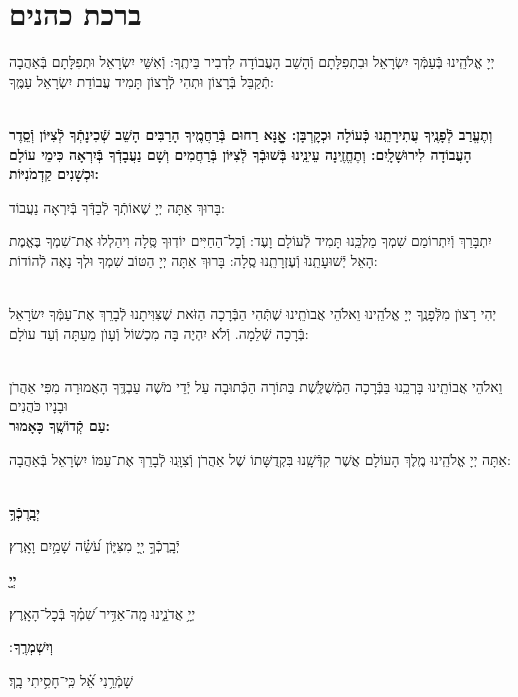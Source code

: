 \documentclass[twoside, openany, parskip=half, 11pt]{book}
\begin{document}
\section[ברכת כהנים]{ ברכת כהנים ‎}
\label{birkaskohanim}

יְיָ אֱלֹהֵֽינוּ בְּֿעַמְּֿךָ יִשְׂרָאֵל וּבִתְפִלָּתָם וְֿהָשֵׁב הָעֲבוֹדָה לִדְבִיר בֵּיתֶֽךָ: וְֿאִשֵּׁי יִשְׂרָאֵל וּתְפִלָּתָם בְּֿאַהֲבָה תְֿקַבֵּל בְּֿרָצוֹן וּתְהִי לְֿרָצוֹן תָּמִיד עֲבוֹדַת יִשְׂרָאֵל עַמֶּֽךָ:

\chazzanvkahal \\
\textbf{
	וְתֶעֱרַב לְֿפָנֶֽיךָ עֲתִירָתֵֽנוּ כְּֿעוֹלָה וּכְקׇרְבָּן:
	אׇׇׇׇָנָּא רַחוּם בְּֿרַחֲמֶֽיךָ הָרַבִּים הָשֵׁב שְֿׁכִינָתְֿךָ לְֿצִיּוֹן וְֿסֵֽדֶר הָעֲבוֹדָה לִירוּשָׁלָֽיִם:
	וְתֶחֱזֶֽינָה עֵינֵֽינוּ בְּֿשׁוּבְֿךָ לְֿצִיּוֹן בְּֿרַחֲמִים
	וְשָׁם נַעֲבָדְֿךָ בְּֿיִרְאָה כִּימֵי עוֹלָם וּכְשָׁנִים קַדְמֹנִיּוֹת:
}

\chazzan
בָּרוּךְ אַתָּה יְיָ שֶׁאוֹתְֿךָ לְֿבַדְּֿךָ בְּֿיִרְאָה נַעֲבוֹד:

\modim

יִתְבָּרַךְ וְֿיִתְרוֹמַם שִׁמְךָ מַלְכֵּֽנוּ תָּמִיד לְֿעוֹלָם וָעֶד: וְֿכׇל־הַחַיִּים יוֹדֽוּךָ סֶּֽלָה וִיהַלְלוּ אֶת־שִׁמְךָ בֶּאֱמֶת הָאֵל יְֿשׁוּעָתֵֽנוּ וְֿעֶזְרָתֵֽנוּ סֶֽלָה: בָּרוּךְ אַתָּה יְיָ הַטּוֹב שִׁמְךָ וּלְךָ נָאֶה לְֿהוֹדוֹת:

\\
יְהִי רָצוׂן מִלְּֿפָנֶֽךָ יְיָ אֱלֹהֵֽינוּ וֵאלֹהֵי אֲבוׂתֵֽינוּ שֶׁתְּֿהִי הַבְּֿרָכָה הַזֹּאת שֶׁצִּוִּיתָנוּ לְֿבָרֵךְ אֶת־עַמְּֿךָ יִשׂרָאֵל בְּֿרָכָה שְֿׁלֵמָה. וְֿלֹא יִהְיֶה בָּה מִכְשׁוֹל וְֿעָוׂן מֵעַתָּה וְֿעַד עוׂלָם:

\\
\shatz {}
וֵאלֹהֵי אֲבוֹתֵֽינוּ בָּרְכֵֽנוּ בַּבְּֿרָכָה הַמְֿשֻׁלֶּֽשֶׁת בַּתּוֹרָה הַכְּֿתוּבָה עַל יְֿדֵי מֹשֶׁה עַבְדֶּֽךָ הָאֲמוּרָה מִפִּי אַהֲרֹן וּבָנָיו כֹּהֲנִים \\
\shatzvkahal
\textbf{עַם קְֿדוֹשֶֽׁךָ כָּאָמוּר:}

אַתָּה יְיָ אֱלֹהֵֽינוּ מֶֽלֶךְ הָעוֹלָם אֲשֶׁר קִדְּֿשָֽׁנוּ בִּקְדֻשָּׁתוֹ שֶׁל אַהֲרֹן וְֿצִוָּֽנוּ לְֿבָרֵךְ אֶת־עַמּוֹ יִשְׂרָאֵל בְּֿאַהֲבָה:


\\
\textbf{יְבָֽרֶכְֿךָ֥}
\hfill \begin{footnotesize}
	 יְֿבָֽרֶכְֿךָ֣ יְ֖יָ מִצִּיּ֑וֹן עֹ֝שֵׂ֗ה שָׁמַ֥יִם וָאָֽרֶץ׃\\
\end{footnotesize}
\textbf{יְיָ֖}
\hfill \begin{footnotesize}
	 יְיָ֥ אֲדֹנֵ֑ינוּ מָֽה־אַדִּ֥יר שִׁ֝מְ֗ךָ בְּֿכׇל־הָאָֽרֶץ׃\\
\end{footnotesize}
\textbf{וְיִשְׁמְרֶֽךָ}
׃ \hfill \begin{footnotesize}
	 שָׁמְֿרֵ֥נִי אֵ֝֗ל כִּֽי־חָסִ֥יתִי בָֽךְ׃
\end{footnotesize}
\end{document}
